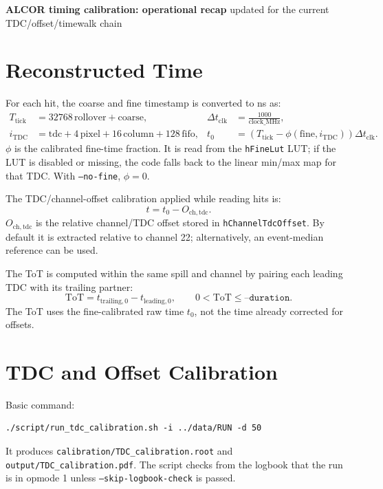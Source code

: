 \documentclass[10pt]{article}
\begin{document}
\sloppy

{\Large \textbf{ALCOR timing calibration: operational recap}}\hfill
{\small updated for the current TDC/offset/timewalk chain}
\vspace{0.5em}

\section*{Reconstructed Time}
For each hit, the coarse and fine timestamp is converted to ns as:
\begin{align*}
  T_\mathrm{tick} &= 32768\,\mathrm{rollover} + \mathrm{coarse}, &
  \Delta t_\mathrm{clk} &= \frac{1000}{\mathrm{clock\_MHz}}, \\
  i_\mathrm{TDC} &= \mathrm{tdc} + 4\,\mathrm{pixel} + 16\,\mathrm{column} + 128\,\mathrm{fifo}, &
  t_0 &= \left(T_\mathrm{tick} - \phi(\mathrm{fine}, i_\mathrm{TDC})\right)\Delta t_\mathrm{clk}.
\end{align*}
\(\phi\) is the calibrated fine-time fraction. It is read from the \texttt{hFineLut} LUT; if the LUT is disabled or missing, the code falls back to the linear min/max map for that TDC. With \texttt{--no-fine}, \(\phi=0\).

The TDC/channel-offset calibration applied while reading hits is:
\[
  t = t_0 - O_{\mathrm{ch},\mathrm{tdc}} .
\]
\(O_{\mathrm{ch},\mathrm{tdc}}\) is the relative channel/TDC offset stored in \texttt{hChannelTdcOffset}. By default it is extracted relative to channel 22; alternatively, an event-median reference can be used.

The ToT is computed within the same spill and channel by pairing each leading TDC with its trailing partner:
\[
  \mathrm{ToT}=t_{\mathrm{trailing},0}-t_{\mathrm{leading},0},\qquad 0 < \mathrm{ToT} \le \texttt{--duration}.
\]
The ToT uses the fine-calibrated raw time \(t_0\), not the time already corrected for offsets.

\section*{TDC and Offset Calibration}
Basic command:
\begin{verbatim}
./script/run_tdc_calibration.sh -i ../data/RUN -d 50
\end{verbatim}
It produces \texttt{calibration/TDC\_calibration.root} and \texttt{output/TDC\_calibration.pdf}. The script checks from the logbook that the run is in opmode 1 unless \texttt{--skip-logbook-check} is passed.
\end{document}
